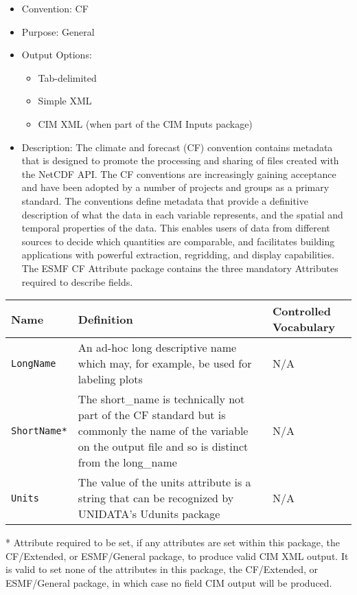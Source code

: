 \begin{itemize}
    \item Convention: CF
    \item Purpose: General
    \item Output Options:
    \begin{itemize}
        \item Tab-delimited
        \item Simple XML
        \item CIM XML (when part of the CIM Inputs package)
    \end{itemize} 
    \item  Description: The climate and forecast (CF) convention contains metadata that is designed to promote the processing and sharing of files created with the NetCDF API. The CF conventions are increasingly gaining acceptance and have been adopted by a number of projects and groups as a primary standard. The conventions define metadata that provide a definitive description of what the data in each variable represents, and the spatial and temporal properties of the data. This enables users of data from different sources to decide which quantities are comparable, and facilitates building applications with powerful extraction, regridding, and display capabilities. The ESMF CF Attribute package contains the three mandatory Attributes required to describe fields. 
\end{itemize}

\begin{tabular}{|p{5cm}|p{5cm}|p{4cm}|}
    \hline\hline
    {\bf Name } & {\bf Definition} & {\bf Controlled Vocabulary} \\
    \hline\hline
    {\tt LongName} & An ad-hoc long descriptive name which may, for example, be used for labeling plots & N/A\\
    {\tt ShortName*}  & The short\_name is technically not part of the CF standard but is commonly the name of the variable on the output file and so is
 distinct from the long\_name & N/A \\
    {\tt Units}  & The value of the units attribute is a string that can be recognized by UNIDATA's Udunits package & N/A\\
    \hline\hline
\end{tabular}
\linebreak
* Attribute required to be set, if any attributes are set within this package, the CF/Extended, or ESMF/General package, to produce valid CIM XML output. It is valid to set none of the attributes in this package, the CF/Extended, or ESMF/General package, in which case no field CIM output will be produced. \\

